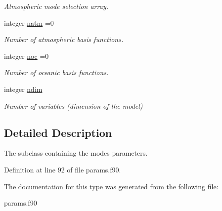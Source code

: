 \begin{DoxyCompactItemize}
\begin{DoxyCompactList}\small\item\em Atmospheric mode selection array. \end{DoxyCompactList}\item 
\mbox{\label{structparams_1_1modesconfiguration_a7ede74e1e6b6d7cda3dd09a02797a884}} 
integer \hyperlink{structparams_1_1modesconfiguration_a7ede74e1e6b6d7cda3dd09a02797a884}{natm} =0
\begin{DoxyCompactList}\small\item\em Number of atmospheric basis functions. \end{DoxyCompactList}\item 
\mbox{\label{structparams_1_1modesconfiguration_a1e4bfd9c3ab523dcb6b8f7547cc4e8ca}} 
integer \hyperlink{structparams_1_1modesconfiguration_a1e4bfd9c3ab523dcb6b8f7547cc4e8ca}{noc} =0
\begin{DoxyCompactList}\small\item\em Number of oceanic basis functions. \end{DoxyCompactList}\item 
\mbox{\label{structparams_1_1modesconfiguration_aadba4b01a2ee12635e80e3ef183f8b51}} 
integer \hyperlink{structparams_1_1modesconfiguration_aadba4b01a2ee12635e80e3ef183f8b51}{ndim}
\begin{DoxyCompactList}\small\item\em Number of variables (dimension of the model) \end{DoxyCompactList}\end{DoxyCompactItemize}


\subsection{Detailed Description}
The subclass containing the modes parameters. 

Definition at line 92 of file params.\+f90.



The documentation for this type was generated from the following file\+:\begin{DoxyCompactItemize}
\item 
params.\+f90\end{DoxyCompactItemize}
